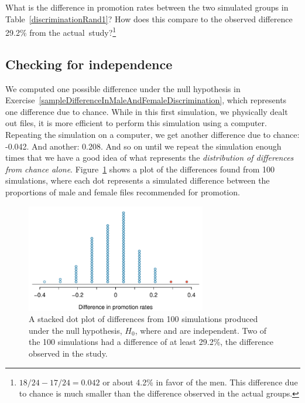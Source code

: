 \begin{exercise} \label{sampleDifferenceInMaleAndFemaleDiscrimination}
What is the difference in promotion rates between the two simulated groups in Table~\ref{discriminationRand1}? How does this compare to the observed difference 29.2\% from the actual~study?\footnote{$18/24 - 17/24=0.042$ or about 4.2\% in favor of the men. This difference due to chance is much smaller than the difference observed in the actual groups.}
\end{exercise}

\subsection{Checking for independence}

We computed one possible difference under the null hypothesis in Exercise~\ref{sampleDifferenceInMaleAndFemaleDiscrimination}, which represents one difference due to chance. While in this first simulation, we physically dealt out files, it is more efficient to perform this simulation using a computer. Repeating the simulation on a computer, we get another difference due to chance: -0.042. And another: 0.208. And so on until we repeat the simulation enough times that we have a good idea of what represents the \emph{distribution of differences from chance alone}. Figure~\ref{discRandDotPlot} shows a plot of the differences found from 100 simulations, where each dot represents a simulated difference between the proportions of male and female files recommended for promotion.

\begin{figure}[ht]
\centering
\includegraphics[width=0.7\textwidth]{02/figures/discRandDotPlot/discRandDotPlot}
\caption{A stacked dot plot of differences from 100 simulations produced under the null hypothesis, $H_0$, where  and  are independent. Two of the 100 simulations had a difference of at least 29.2\%, the difference observed in the study.}
\label{discRandDotPlot}
\end{figure}

